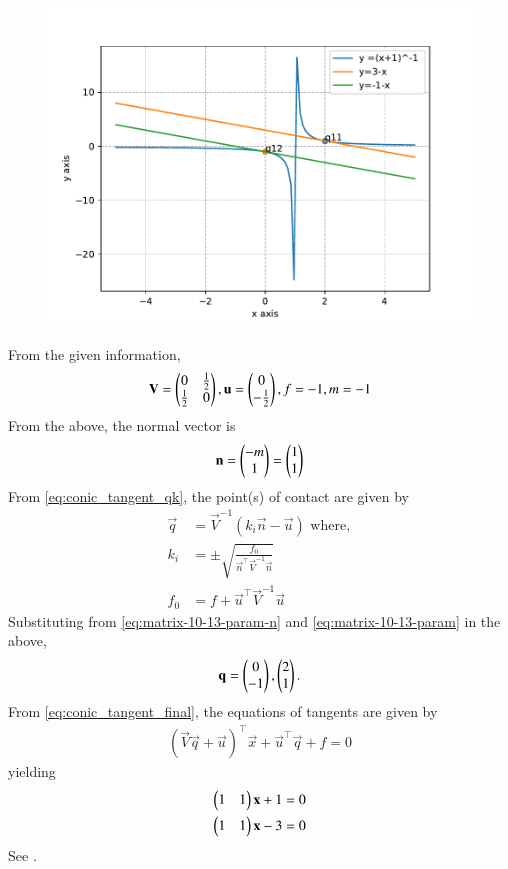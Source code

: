 	\begin{figure}[!ht]
		\centering
 \includegraphics[width=\columnwidth]{chapters/12/6/3/10/figs/conic1.pdf}
		\caption{}
		\label{fig:12/6/3/10}
  	\end{figure}
From the given information, 
\begin{align}
	\mathbf{V}
	=\begin{pmatrix}
		0 & \frac{1}{2}\\\frac{1}{2}& 0\\
	\end{pmatrix},
\mathbf{u} = \begin{pmatrix}
0 \\-\frac{1}{2}\\
\end{pmatrix},  f = -1, m=-1
	\label{eq:matrix-10-13-param}
\end{align}
From the above, the  normal vector is
\begin{align}
\mathbf{n}=\begin{pmatrix}
-m \\ 1
	\end{pmatrix} = \begin{pmatrix}1 \\ 1\end{pmatrix}
	\label{eq:matrix-10-13-param-n}
\end{align}
From 
\eqref{eq:conic_tangent_qk},
	the point(s) of contact are given by
\begin{align}
	\vec{q}&=\vec{V}^{-1}(k_i\vec{n}-\vec{u}) 
	\text{ where},\\
	k_i&=\pm \sqrt{\frac{f_0}{\vec{n}^{\top}\vec{V}^{-1}\vec{n}}}\\
	f_0&=f+\vec{u}^{\top}\vec{V}^{-1}\vec{u}
\end{align}
Substituting from 
	\eqref{eq:matrix-10-13-param-n}
	and
	\eqref{eq:matrix-10-13-param}
	in the above,
\begin{align}
\mathbf{q}=\begin{pmatrix}0 \\-1\end{pmatrix}, \begin{pmatrix}2 \\ 1\end{pmatrix}.
\end{align}
From 
  \eqref{eq:conic_tangent_final},
the equations of tangents are given by
\begin{align}
(\vec{V}\vec{q}+\vec{u})^{\top}\vec{x}+\vec{u}^{\top}\vec{q}+f=0
\end{align}
yielding
\begin{align}
	\begin{pmatrix}1 & 1\end{pmatrix}\mathbf{x}+1&=0\\
\begin{pmatrix}1 & 1\end{pmatrix}\mathbf{x}-3&=0\\
\end{align}
See 
		.
